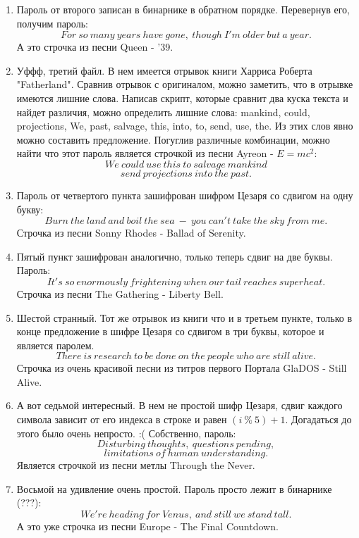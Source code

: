 \documentclass[a4paper,12pt]{article}
\begin{document}
\begin{enumerate}
\begin{enumerate}
\item Пароль от второго записан в бинарнике в обратном порядке. Перевернув его, получим пароль:
\[For\ so\ many\ years\ have\ gone,\ though\ I'm\ older\ but\ a\ year.\]
А это строчка из песни Queen - '39.

\item Уффф, третий файл. В нем имеется отрывок книги Харриса Роберта "Fatherland". Сравнив отрывок с оригиналом, можно заметить, что в отрывке имеются лишние слова. Написав скрипт, которые сравнит два куска текста и найдет различия, можно определить лишние слова: mankind, could, projections, We, past, salvage, this, into, to, send, use, the. Из этих слов явно можно составить предложение. Погуглив различные комбинации, можно найти что этот пароль является строчкой из песни Ayreon - $E=mc^2$:
\[We\ could\ use\ this\ to\ salvage\ mankind\]
\[ send\ projections\ into\ the\ past.\]

\item Пароль от четвертого пункта зашифрован шифром Цезаря со сдвигом на одну букву: 
\[Burn\ the\ land\ and\ boil\ the\ sea\ -\ you\ can't\ take\ the\ sky\ from\ me.\]
Строчка из песни Sonny Rhodes - Ballad of Serenity.

\item Пятый пункт зашифрован аналогично, только теперь сдвиг на две буквы. Пароль:
\[It's\ so\ enormously\ frightening\ when\ our\ tail\ reaches\ superheat.\]
Строчка из песни The Gathering - Liberty Bell.

\item Шестой странный. Тот же отрывок из книги что и в третьем пункте, только в конце предложение в шифре Цезаря со сдвигом в три буквы, которое и является паролем.
\[There\ is\ research\ to\ be\ done\ on\ the\ people\ who\ are\ still\ alive.\]
Строчка из очень красивой песни из титров первого Портала GlaDOS - Still Alive.

\item А вот седьмой интересный. В нем не простой шифр Цезаря, сдвиг каждого символа зависит от его индекса в строке и равен $(i\ \%\ 5) + 1$. Догадаться до этого было очень непросто. :( Собственно, пароль:
\[Disturbing\ thoughts,\ questions\ pending,\]
\[limitations\ of\ human\ understanding.\]
Является строчкой из песни метлы Through the Never.

\item Восьмой на удивление очень простой. Пароль просто лежит в бинарнике (???):
\[We're\ heading\ for\ Venus,\ and\ still\ we\ stand\ tall.\]
А это уже строчка из песни Europe - The Final Countdown.

\end{enumerate}

\end{enumerate}
\end{document}

